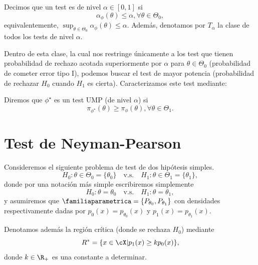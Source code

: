  \begin{definition}
 Decimos que un test es de nivel $\alpha\in[0,1]$ si 
\begin{equation}
 		\alpha_\phi(\theta)\leq\alpha, \forall \theta\in\Theta_0,
 	\end{equation}
 	equivalentemente, $\sup_{\theta\in\Theta_0}\alpha_\phi(\theta)\leq\alpha$. Además, denotamos por $T_\alpha$ la clase de todos los tests de nivel $\alpha$. 
 \end{definition}
 Dentro de esta clase, la cual nos restringe únicamente a los test que tienen probabilidad de rechazo acotada superiormente por $\alpha$  para $\theta\in\Theta_0$ (probabilidad de cometer error tipo I), podemos buscar el test de mayor potencia (probabilidad de rechazar $H_0$ cuando $H_1$ es cierta). Caracterizamos este test mediante: 

 \begin{definition}
 	Diremos que $\phi^\star$ es un test UMP (de nivel $\alpha$)  si 
 	\begin{equation}
 		\pi_{\phi^\star}(\theta)\geq \pi_{\phi}(\theta), \forall\theta\in\Theta_1.
 	\end{equation}
 	
 \end{definition}


\section{Test de Neyman-Pearson} 
\label{sub:test_de_neyman_pearson}
Consideremos el siguiente problema de test de dos hipótesis simples. 
\begin{equation}
	H_0:\theta\in\Theta_0=\{\theta_0\}\quad \text{v.s.}\quad H_1:\theta\in\Theta_1=\{\theta_1\},
\end{equation}
donde por una notación más simple escribiremos simplemente 
\begin{equation}
	H_0:\theta =\theta_0\quad \text{v.s.}\quad H_1:\theta = \theta_1,		
\end{equation}
y asumiremos que $\familiaparametrica=\{P_{\theta_0},P_{\theta_1}\}$ con densidades respectivamente dadas por $p_0(x) = p_{\theta_0}(x)$ y $p_1(x) = p_{\theta_1}(x)$.

Denotamos además la región crítica (donde se rechaza $H_0$) mediante
\begin{equation}
	\label{eq:R_NR}
	R^* = \{x\in\cX | p_1(x) \geq k p_0(x)\},
\end{equation}
donde $k\in\R_+$ es una constante a determinar. 

